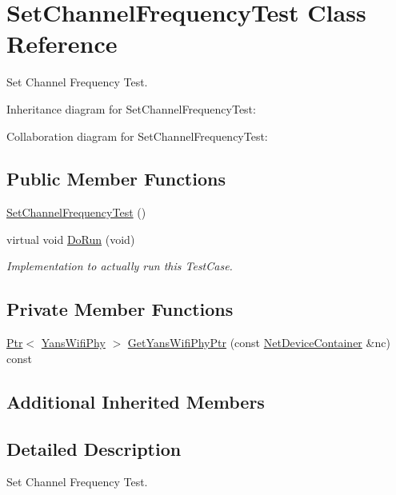 \hypertarget{classSetChannelFrequencyTest}{}\section{Set\+Channel\+Frequency\+Test Class Reference}
\label{classSetChannelFrequencyTest}


Set Channel Frequency Test.  




Inheritance diagram for Set\+Channel\+Frequency\+Test\+:


Collaboration diagram for Set\+Channel\+Frequency\+Test\+:
\subsection*{Public Member Functions}
\begin{DoxyCompactItemize}
\item 
\hyperlink{classSetChannelFrequencyTest_a8f9dc4d7ff55fc179105bf2a706a914e}{Set\+Channel\+Frequency\+Test} ()
\item 
virtual void \hyperlink{classSetChannelFrequencyTest_a05984ce2c264229592bed4981ff05518}{Do\+Run} (void)
\begin{DoxyCompactList}\small\item\em Implementation to actually run this Test\+Case. \end{DoxyCompactList}\end{DoxyCompactItemize}
\subsection*{Private Member Functions}
\begin{DoxyCompactItemize}
\item 
\hyperlink{classns3_1_1Ptr}{Ptr}$<$ \hyperlink{classns3_1_1YansWifiPhy}{Yans\+Wifi\+Phy} $>$ \hyperlink{classSetChannelFrequencyTest_aa30a0a39f98c2d825152681ba8b9f4e1}{Get\+Yans\+Wifi\+Phy\+Ptr} (const \hyperlink{classns3_1_1NetDeviceContainer}{Net\+Device\+Container} \&nc) const 
\end{DoxyCompactItemize}
\subsection*{Additional Inherited Members}


\subsection{Detailed Description}
Set Channel Frequency Test. 

